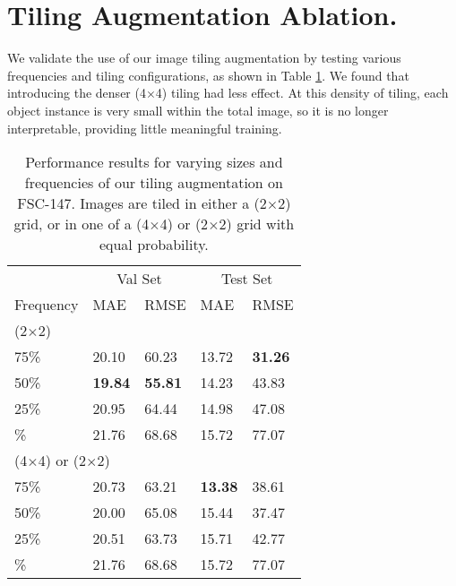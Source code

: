 \documentclass[letterpaper, 11pt]{IEEEtran}
\begin{document}
\section{Tiling Augmentation Ablation.}\label{append_tile}
We validate the use of our image tiling augmentation by testing various frequencies and tiling configurations, as shown in Table \ref{ablation_tile2}. 
We found that introducing the denser (4$\times$4) tiling had less effect. 
At this density of tiling, each object instance is very small within the total image, so it is no longer interpretable, providing little meaningful training. 
\begin{table}[!h]
    \centering
    \fontsize{9}{9}\selectfont
    \begin{tabular}{lllll}
\toprule
  & \multicolumn{2}{c}{Val Set} & \multicolumn{2}{c}{Test Set} \\
 Frequency & MAE & RMSE & MAE & RMSE
 \\
 \midrule
 \multicolumn{5}{l}{(2$\times$2)} \\
75\% & 20.10 & 60.23 & 13.72 & \textbf{31.26} \\
50\% & \textbf{19.84}  & \textbf{55.81} & 14.23  & 43.83 \\
25\% & 20.95 & 64.44 & 14.98 & 47.08 \\
\; 0\% & 21.76 & 68.68 & 15.72 & 77.07 \\
\multicolumn{5}{l}{(4$\times$4) or (2$\times$2)} \\
75\% & 20.73 & 63.21 & \textbf{13.38} & 38.61\\
50\% & 20.00 & 65.08 & 15.44 & 37.47 \\
25\% & 20.51 & 63.73 & 15.71 & 42.77\\
\; 0\% & 21.76 & 68.68 & 15.72 & 77.07\\
\bottomrule
\end{tabular}

 



     \caption{Performance results for varying sizes and frequencies of our tiling augmentation on FSC-147. Images are tiled in either a (2$\times$2) grid, or in one of a (4$\times$4) or (2$\times$2) grid with equal probability.
    }
    \label{ablation_tile2}
\end{table} 
\end{document}
